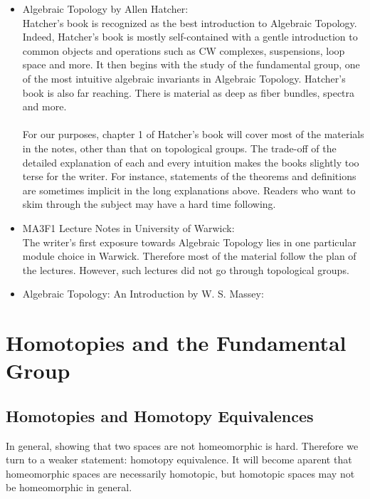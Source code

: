 \documentclass[a4paper]{article}
\begin{document}
\begin{itemize}
\item Algebraic Topology by Allen Hatcher: \\
Hatcher's book is recognized as the best introduction to Algebraic Topology. Indeed, Hatcher's book is mostly self-contained with a gentle introduction to common objects and operations such as CW complexes, suspensions, loop space and more. It then begins with the study of the fundamental group, one of the most intuitive algebraic invariants in Algebraic Topology. Hatcher's book is also far reaching. There is material as deep as fiber bundles, spectra and more. \\~\\

For our purposes, chapter 1 of Hatcher's book will cover most of the materials in the notes, other than that on topological groups. The trade-off of the detailed explanation of each and every intuition makes the books slightly too terse for the writer. For instance, statements of the theorems and definitions are sometimes implicit in the long explanations above. Readers who want to skim through the subject may have a hard time following. 

\item MA3F1 Lecture Notes in University of Warwick: \\
The writer's first exposure towards Algebraic Topology lies in one particular module choice in Warwick. Therefore most of the material follow the plan of the lectures. However, such lectures did not go through topological groups. 

\item Algebraic Topology: An Introduction by W. S. Massey: \\
\end{itemize}

\pagebreak
\tableofcontents
\pagebreak

\section{Homotopies and the Fundamental Group}
\subsection{Homotopies and Homotopy Equivalences}
In general, showing that two spaces are not homeomorphic is hard. Therefore we turn to a weaker statement: homotopy equivalence. It will become aparent that homeomorphic spaces are necessarily homotopic, but homotopic spaces may not be homeomorphic in general. 
\end{document}
